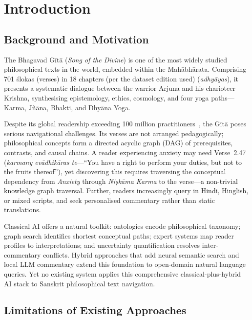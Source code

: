 \documentclass[conference]{IEEEtran}
\begin{document}
\section{Introduction}

\subsection{Background and Motivation}

The Bhagavad G\={i}t\={a} (\textit{Song of the Divine}) is one of the most
widely studied philosophical texts in the world, embedded within the
Mah\={a}bh\={a}rata. Comprising 701 \'{s}lokas (verses) in 18 chapters (per the dataset edition used)
(\textit{adhy\={a}yas}), it presents a systematic dialogue between the warrior
Arjuna and his charioteer Krishna, synthesising epistemology, ethics, cosmology,
and four yoga paths—Karma, J\~{n}\={a}na, Bhakti, and Dhy\={a}na Yoga.

Despite its global readership exceeding 100 million practitioners~\cite{flood1996introduction},
the G\={i}t\={a} poses serious navigational challenges. Its verses are not arranged
pedagogically; philosophical concepts form a directed acyclic graph (DAG) of
prerequisites, contrasts, and causal chains. A reader experiencing anxiety may
need Verse~2.47 (\textit{karmany ev\={a}dhik\={a}ras te}—``You have a right to
perform your duties, but not to the fruits thereof''), yet discovering this
requires traversing the conceptual dependency from \textit{Anxiety} through
\textit{Ni\d{s}k\={a}ma Karma} to the verse—a non-trivial knowledge graph
traversal. Further, readers increasingly query in Hindi, Hinglish, or mixed
scripts, and seek personalised commentary rather than static translations.

Classical AI offers a natural toolkit: ontologies encode philosophical taxonomy;
graph search identifies shortest conceptual paths; expert systems map reader
profiles to interpretations; and uncertainty quantification resolves
inter-commentary conflicts. Hybrid approaches that add neural semantic search
and local LLM commentary extend this foundation to open-domain natural language
queries. Yet no existing system applies this comprehensive classical-plus-hybrid
AI stack to Sanskrit philosophical text navigation.

\subsection{Limitations of Existing Approaches}
\end{document}

